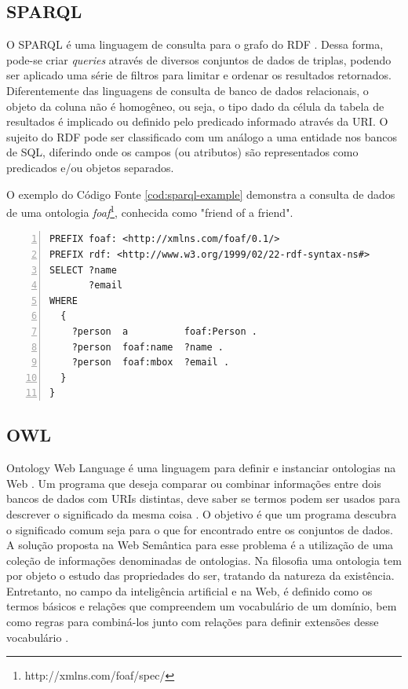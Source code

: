 \subsection{SPARQL}

O SPARQL é uma linguagem de consulta para o grafo do RDF \citep{SparqlW3C}. Dessa forma, pode-se criar \textit{queries} através de diversos conjuntos de dados de triplas, podendo ser aplicado uma série de filtros para limitar e ordenar os resultados retornados. Diferentemente das linguagens de consulta de banco de dados relacionais, o objeto da coluna não é homogêneo, ou seja, o tipo dado da célula da tabela de resultados é implicado ou definido pelo predicado informado através da URI. O sujeito do RDF pode ser classificado com um análogo a uma entidade nos bancos de \ac{SQL}, diferindo onde os campos (ou atributos) são representados como predicados e/ou objetos separados.

O exemplo do Código Fonte \ref{cod:sparql-example} demonstra a consulta de dados de uma ontologia \textit{foaf}\footnote{http://xmlns.com/foaf/spec/}, conhecida como "friend of a friend".

\begin{lstlisting}[caption=Exemplo de consulta na linguagem SPARQL, language=SPARQL, frame=single, label={cod:sparql-example}, float, numbers=left]
PREFIX foaf: <http://xmlns.com/foaf/0.1/>
PREFIX rdf: <http://www.w3.org/1999/02/22-rdf-syntax-ns#>
SELECT ?name
       ?email
WHERE
  {
    ?person  a          foaf:Person .
    ?person  foaf:name  ?name .
    ?person  foaf:mbox  ?email .
  }
}
\end{lstlisting}

\subsection{OWL}

Ontology Web Language é uma linguagem para definir e instanciar ontologias na Web \citep{OWLW3C}. Um programa que deseja comparar ou combinar informações entre dois bancos de dados com URIs distintas, deve saber se termos podem ser usados para descrever o significado da mesma coisa \citep{bernerslee2001semantic}. O objetivo é que um programa descubra o significado comum seja para o que for encontrado entre os conjuntos de dados. A solução proposta na Web Semântica para esse problema é a utilização de uma coleção de informações denominadas de ontologias. Na filosofia uma ontologia tem por objeto o estudo das propriedades do ser, tratando da natureza da existência. Entretanto, no campo da inteligência artificial e na Web, é definido como os termos básicos e relações que compreendem um vocabulário de um domínio, bem como regras para combiná-los junto com relações para definir extensões desse vocabulário \citep{Patil:1992:DKS:3087223.3087302}.

